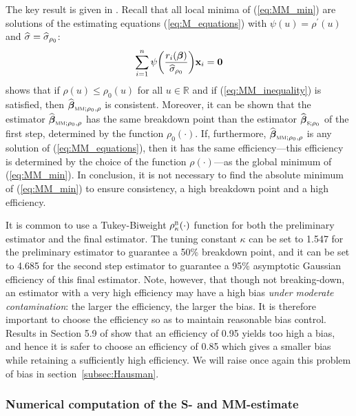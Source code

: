 The key result is given in \citet{yohai:1987}. Recall that all local minima of
(\ref{eq:MM_min}) are solutions of the estimating equations
(\ref{eq:M_equations}) with $\psi(u) = \rho^{\prime}(u)$ and $\widehat{\sigma} =
\widehat{\sigma}_{\rho_{0}}$:
%
\begin{equation}\label{eq:MM_equations}
    \sum_{i=1}^{n} \psi\left(\frac{r_{i}(\boldsymbol\beta)}{\sthat{\sigma}_{\rho_{0}}}\right)
    \stvec{x}_{i} = \stvec{0}
\end{equation}
%
\citeauthor{yohai:1987} shows that if $\rho(u) \leq \rho_{0}(u)$ for all $u \in
\mathbb{R}$ and if (\ref{eq:MM_inequality}) is satisfied, then
$\sthat{\boldsymbol\beta}_{\stsc{MM};\rho_{0},\rho}$ is consistent. Moreover,
it can be shown that the  estimator
$\sthat{\boldsymbol\beta}_{\stsc{MM};\rho_{0},\rho}$ has the same breakdown
point than the  estimator
$\sthat{\boldsymbol\beta}_{\stsc{S};\rho_{0}}$ of the first step, determined by
the function $\rho_{0}(\cdot)$. If, furthermore,
$\sthat{\boldsymbol\beta}_{\stsc{MM};\rho_{0},\rho}$ is any solution of
(\ref{eq:MM_equations}), then it has the same efficiency---this efficiency is
determined by the choice of the function $\rho(\cdot)$---as the global minimum
of (\ref{eq:MM_min}). In conclusion, it is not necessary to find the absolute
minimum of (\ref{eq:MM_min}) to ensure consistency, a high breakdown point and
a high efficiency.

It is common to use a Tukey-Biweight $\rho_{\kappa}^{\stsc{B}}(\cdot)$ function
for both the preliminary  estimator and the final  estimator.
The tuning constant $\kappa$ can be set to 1.547 for the preliminary 
estimator to guarantee a 50\% breakdown point, and it can be set to 4.685 for
the second step  estimator to guarantee a 95\% asymptotic Gaussian
efficiency of this final estimator. Note, however, that though not
breaking-down, an  estimator with a very high efficiency may have a
high bias \emph{under moderate contamination}: the larger the efficiency, the
larger the bias. It is therefore important to choose the efficiency so as to
maintain reasonable bias control. Results in Section 5.9 of
\citet{maronna:etal:2006} show that an efficiency of 0.95 yields too high a
bias, and hence it is safer to choose an efficiency of 0.85 which gives a
smaller bias while retaining a sufficiently high efficiency. We will raise once
again this problem of bias in section~\ref{subsec:Hausman}.

\subsubsection{Numerical computation of the S- and MM-estimate}

